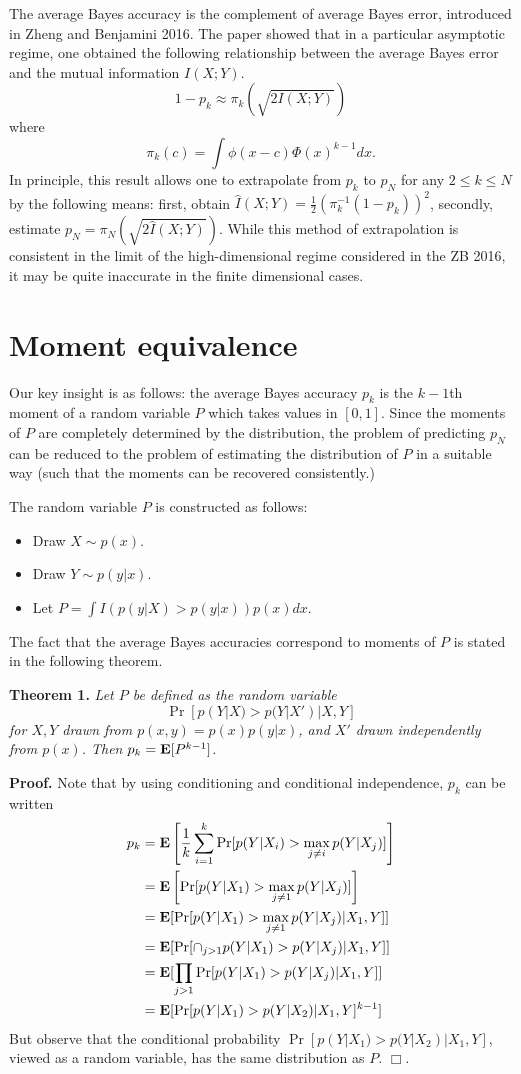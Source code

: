 \documentclass[12pt]{article}
\begin{document}
The average Bayes accuracy is the complement of average Bayes error,
 introduced in Zheng and Benjamini 2016.
The paper showed that in a particular asymptotic regime, one obtained the following relationship between
the average Bayes error and the mutual information $I(X;Y)$.
\[
1 - p_k \approx \pi_k(\sqrt{2I(X;Y)})
\]
where
\[
\pi_k(c) = \int \phi(x - c) \Phi(x)^{k-1} dx.
\]
In principle, this result allows one to extrapolate from $p_k$ to $p_N$ for any $2 \leq k \leq N$ by the following means: first, obtain $\hat{I}(X; Y) = \frac{1}{2}(\pi_k^{-1}(1-p_k))^2$,
secondly, estimate $p_N = \pi_N(\sqrt{2 \hat{I}(X; Y)})$.
While this method of extrapolation is consistent in the limit of the high-dimensional regime
considered in the ZB 2016, it may be quite inaccurate in the finite dimensional cases.

\section{Moment equivalence}

Our key insight is as follows: the average Bayes accuracy $p_k$ is the $k-1$th moment of a random variable $P$ which takes values in $[0,1]$.
Since the moments of $P$ are completely determined by the distribution,
the problem of predicting $p_N$ can be reduced to the problem of estimating the distribution of $P$
in a suitable way (such that the moments can be recovered consistently.)

The random variable $P$ is constructed as follows:
\begin{itemize}
\item Draw $X \sim p(x)$.
\item Draw $Y \sim p(y|x)$.
\item Let $P = \int I(p(y|X) > p(y|x)) p(x) dx.$ 
\end{itemize}

The fact that the average Bayes accuracies correspond to moments of $P$ is stated in the following theorem.

\noindent\textbf{Theorem 1.} \emph{
Let $P$ be defined as the random variable
\[\Pr[p(Y|X) > p(Y|X')|X, Y]\]
for $X, Y$ drawn from $p(x, y) = p(x) p(y|x)$,
and $X'$ drawn independently from $p(x)$.
Then $p_k = \textbf{E}[P^{k-1}]$.
}

\noindent\textbf{Proof.}
Note that by using conditioning and conditional independence, $p_k$ can be written
\begin{align*}
p_k &= \textbf{E}\left[ \frac{1}{k}\sum_{i=1}^k  \Pr[p(Y|X_i) > \max_{j\neq i} p(Y|X_j)] \right]
\\&= \textbf{E}\left[ \Pr[p(Y|X_1) > \max_{j\neq 1} p(Y|X_j)] \right]
\\&= \textbf{E}[\Pr[p(Y|X_1) > \max_{j\neq 1} p(Y|X_j)|X_1, Y]]
\\&= \textbf{E}[\Pr[\cap_{j > 1} p(Y|X_1) > p(Y|X_j)|X_1, Y]]
\\&= \textbf{E}[\prod_{j > 1}\Pr[p(Y|X_1) > p(Y|X_j)|X_1, Y]]
\\&= \textbf{E}[\Pr[p(Y|X_1) > p(Y|X_2)|X_1, Y]^{k-1}]
\end{align*}
But observe that the conditional probability $\Pr[p(Y|X_1) > p(Y|X_2)|X_1, Y]$, viewed as a random variable,
has the same distribution as $P$. $\Box$.
\end{document}
